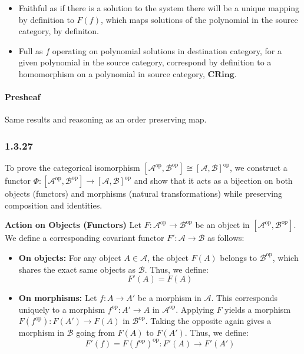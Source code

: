 \documentclass{article}
\begin{document}
\begin{itemize}
\item
Faithful as if there is a solution to the system there will be a unique mapping by definition to $F(f)$, which maps solutions of the polynomial in the source category, by definiton.

\item Full as $f$ operating on polynomial solutions in destination category, for a given polynomial in the source category, correspond by definition to a homomorphism on a polynomial in source category, $\mathbf{CRing}$.
\end{itemize}

\paragraph{Presheaf}

Same results and reasoning as an order preserving map.

\subsubsection*{ 1.3.27 }

To prove the categorical isomorphism \textbf{$[\mathcal{A}^\text{op}, \mathcal{B}^\text{op}] \cong [\mathcal{A}, \mathcal{B}]^\text{op}$}, we construct a functor $\Phi: [\mathcal{A}^\text{op}, \mathcal{B}^\text{op}] \to [\mathcal{A}, \mathcal{B}]^\text{op}$ and show that it acts as a bijection on both objects (functors) and morphisms (natural transformations) while preserving composition and identities.

\textbf{Action on Objects (Functors)}
Let $F: \mathcal{A}^\text{op} \to \mathcal{B}^\text{op}$ be an object in $[\mathcal{A}^\text{op}, \mathcal{B}^\text{op}]$. We define a corresponding covariant functor $F': \mathcal{A} \to \mathcal{B}$ as follows:

\begin{itemize}
    \item \textbf{On objects:} For any object $A \in \mathcal{A}$, the object $F(A)$ belongs to $\mathcal{B}^\text{op}$, which shares the exact same objects as $\mathcal{B}$. Thus, we define:
    \[ F'(A) = F(A) \]
    
    \item \textbf{On morphisms:} Let $f: A \to A'$ be a morphism in $\mathcal{A}$. This corresponds uniquely to a morphism $f^\text{op}: A' \to A$ in $\mathcal{A}^\text{op}$. Applying $F$ yields a morphism $F(f^\text{op}): F(A') \to F(A)$ in $\mathcal{B}^\text{op}$. Taking the opposite again gives a morphism in $\mathcal{B}$ going from $F(A)$ to $F(A')$. Thus, we define:
    \[ F'(f) = F(f^\text{op})^\text{op}: F'(A) \to F'(A') \]
\end{itemize}
\end{document}
